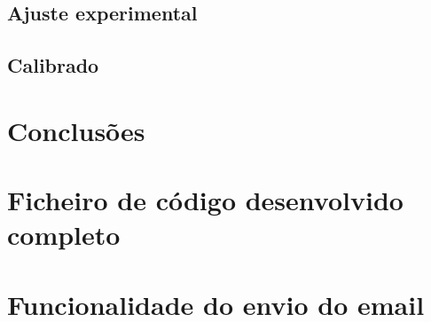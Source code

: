 \documentclass[11pt]{article}
\renewcommand{\footrulewidth}{0.4pt} %
\renewcommand{\appendixpagename}{\LARGE \fontfamily{cmss}\selectfont Apêndices}
\renewcommand{\appendixtocname}{Apêndices}
\begin{document}
    \subsection{Ajuste experimental}\label{subsec:Ajuste experimental}
        
    \subsection{Calibrado}\label{subsec:Calibrado}
        
        
\section{Conclusões}\label{sec:Conclusões}
    

\newpage
\pagestyle{fancy}
\fancyhf{} %
\renewcommand{\headrulewidth}{0pt} %
\renewcommand{\footrulewidth}{0pt} %
% 
% 


\appendix  
\addappheadtotoc 
\appendixpage

\section{Ficheiro de código desenvolvido completo}\label{ap:Ficheiro de código desenvolvido completo}
    
    
\section{Funcionalidade do envio do email}\label{ap:Funcionalidade do envio do email}
    




\end{document}
